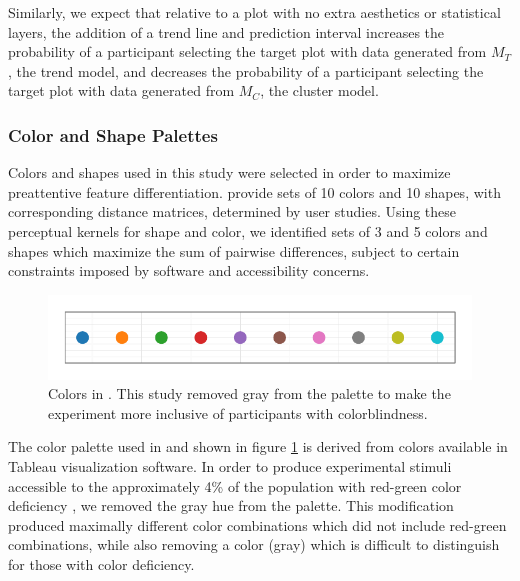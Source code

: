 \documentclass[11pt]{isuthesis}\usepackage[]{graphicx}\usepackage[]{color}
\newenvironment{knitrout}{}{} %
\begin{document}
Similarly, we expect that relative to a plot with no extra aesthetics or statistical layers, the addition of a trend line and prediction interval  increases the probability of a participant selecting the target plot with data generated from $M_T$, the trend model, and decreases the probability of a participant selecting the target plot with data generated from $M_C$, the cluster model.

\subsubsection{Color and Shape Palettes}
Colors and shapes used in this study were selected in order to maximize preattentive feature differentiation. \citet{heer:2014} provide sets of 10 colors and 10 shapes, with corresponding distance matrices, determined by user studies. Using these perceptual kernels for shape and color, we identified sets of 3 and 5 colors and shapes which maximize the sum of pairwise differences, subject to certain constraints imposed by software and accessibility concerns. 

\begin{figure}[ht]\centering
\begin{knitrout}
\color{fgcolor}

{\centering \includegraphics[width=.5\linewidth]{Figure/FeatureHierarchy/fig-color-palette-1} 

}



\end{knitrout}
\caption[Color palette used to maximize preattentive perception]{Colors in \protect\citet{heer:2014}. This study removed gray from the palette to make the experiment more inclusive of participants with colorblindness.\label{fig:colors}}
\end{figure}

The color palette used in \citet{heer:2014} and shown in figure \ref{fig:colors} is derived from colors available in Tableau visualization software\citep{tableau}. 
In order to produce experimental stimuli accessible to the approximately 4\% of the population with red-green color deficiency \citep{colorvision}, we removed the gray hue from the palette. This modification produced maximally different color combinations which did not include red-green combinations, while also removing a color (gray) which is difficult to distinguish for those with color deficiency.  
\end{document}
